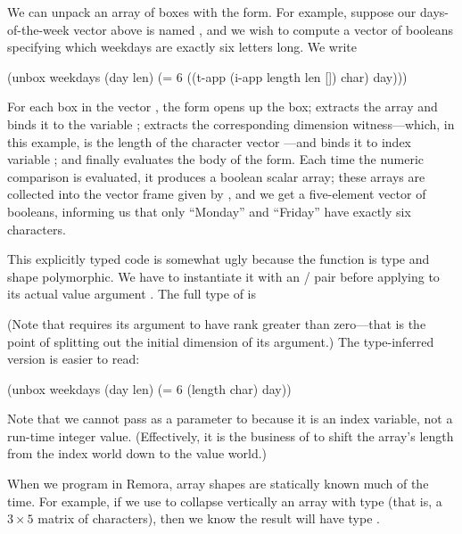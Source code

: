 We can unpack an array of boxes with the  form.
For example, suppose our days-of-the-week vector above is named ,
and we wish to compute a vector of booleans specifying which weekdays
are exactly six letters long.
We write
\begin{code}
    (unbox weekdays (day len)
      (= 6 ((t-app (i-app length len []) char) day)))

\result{[#t #f #f #f #t]}\end{code}

For each box in the vector ,
the  form opens up the box;
extracts the array and binds it to the variable ;
extracts the corresponding dimension witness---which, in this
example, is the length of the character vector ---and
binds it to index variable ;
and  finally evaluates the body of the form.
Each time the \ex{=} numeric comparison is evaluated,
it produces a boolean scalar array;
these arrays are collected into the vector frame given by ,
and we get a five-element vector of booleans,
informing us that only ``Monday'' and ``Friday'' have exactly six characters.

This explicitly typed code is somewhat ugly because
the  function is type and shape polymorphic.
We have to instantiate it with an  /  pair
before applying to its actual value argument .
The full type of  is
\begin{code}
\end{code}
(Note that  requires its argument to have rank
greater than zero---that is the point of splitting out the initial
dimension  of its argument.)
The type-inferred version is easier to read:
\begin{code}
(unbox weekdays (day len)
  (= 6 (length char) day))\end{code}

Note that we cannot pass  as a parameter to \ex{=} 
because it is an index variable, not a run-time integer value.
(Effectively, it is the business of  to shift the array's
length from the index world down to the value world.)


When we program in Remora,
array shapes are statically known much of the time.
For example, if we use  to collapse vertically an array with
type \ex{[char 3 5]}
(that is, a $3 \times 5$ matrix of characters),
then we know the result will have type \ex{[char 3]}.

